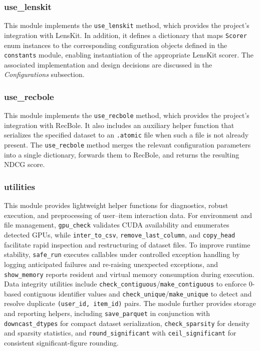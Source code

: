 \documentclass[12pt,a4paper]{article}
\begin{document}
\subsubsection{use\_lenskit}
This module implements the \texttt{use\_lenskit} method, which provides the project's integration with LensKit. In addition, it defines a dictionary that maps \texttt{Scorer} enum instances to the corresponding configuration objects defined in the \texttt{constants} module, enabling instantiation of the appropriate LensKit scorer. The associated implementation and design decisions are discussed in the \emph{Configurations} subsection.

\subsubsection{use\_recbole}
This module implements the \texttt{use\_recbole} method, which provides the project’s integration with RecBole. It also includes an auxiliary helper function that serializes the specified dataset to an \texttt{.atomic} file when such a file is not already present. The \texttt{use\_recbole} method merges the relevant configuration parameters into a single dictionary, forwards them to RecBole, and returns the resulting NDCG score.

\subsubsection{utilities}
This module provides lightweight helper functions for diagnostics, robust execution, and preprocessing of user--item interaction data. For environment and file management, \texttt{gpu\_check} validates CUDA availability and enumerates detected GPUs, while \texttt{inter\_to\_csv}, \texttt{remove\_last\_column}, and \texttt{copy\_head} facilitate rapid inspection and restructuring of dataset files. To improve runtime stability, \texttt{safe\_run} executes callables under controlled exception handling by logging anticipated failures and re-raising unexpected exceptions, and \texttt{show\_memory} reports resident and virtual memory consumption during execution. Data integrity utilities include \texttt{check\_contiguous}/\texttt{make\_contiguous} to enforce 0-based contiguous identifier values and \texttt{check\_unique}/\texttt{make\_unique} to detect and resolve duplicate \texttt{(user\_id, item\_id)} pairs. The module further provides storage and reporting helpers, including \texttt{save\_parquet} in conjunction with \texttt{downcast\_dtypes} for compact dataset serialization, \texttt{check\_sparsity} for density and sparsity statistics, and \texttt{round\_significant} with \texttt{ceil\_significant} for consistent significant-figure rounding.
\end{document}

